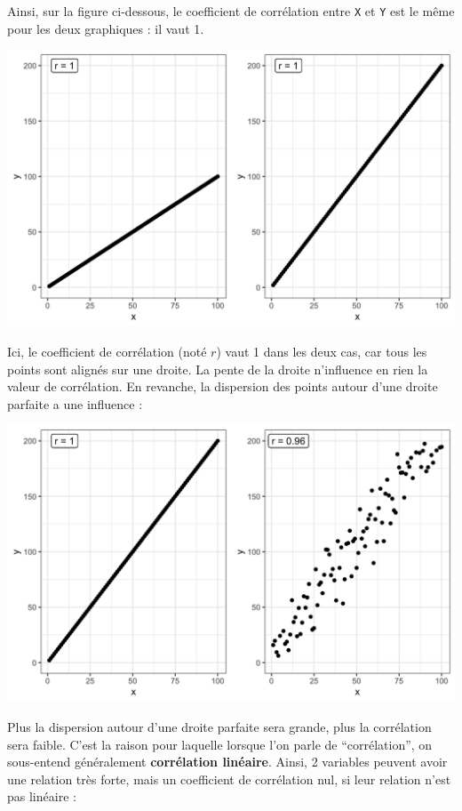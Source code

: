 \documentclass[a4paperpaper,]{article}
\begin{document}
Ainsi, sur la figure ci-dessous, le coefficient de corrélation entre \texttt{X} et \texttt{Y} est le même pour les deux graphiques : il vaut 1.

\begin{center}\includegraphics[width=0.9\linewidth]{figure/unnamed-chunk-95-1} \end{center}

Ici, le coefficient de corrélation (noté \(r\)) vaut 1 dans les deux cas, car tous les points sont alignés sur une droite. La pente de la droite n'influence en rien la valeur de corrélation. En revanche, la dispersion des points autour d'une droite parfaite a une influence :

\begin{center}\includegraphics[width=0.9\linewidth]{figure/unnamed-chunk-96-1} \end{center}

Plus la dispersion autour d'une droite parfaite sera grande, plus la corrélation sera faible. C'est la raison pour laquelle lorsque l'on parle de ``corrélation'', on sous-entend généralement \textbf{corrélation linéaire}. Ainsi, 2 variables peuvent avoir une relation très forte, mais un coefficient de corrélation nul, si leur relation n'est pas linéaire :
\end{document}
